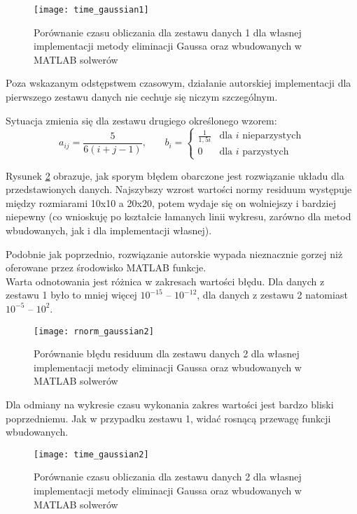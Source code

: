 \documentclass[12pt]{article}
\begin{document}
\begin{figure}[!htbp]
\centering
\texttt{[image: time\_gaussian1]}
\caption{Porównanie czasu obliczania dla zestawu danych 1 dla własnej implementacji metody eliminacji Gaussa oraz wbudowanych w MATLAB solwerów}
\label{fig:time_gaussian1}
\end{figure}
\FloatBarrier

Poza wskazanym odstępstwem czasowym, działanie autorskiej implementacji dla pierwszego zestawu danych nie cechuje się niczym szczególnym.

Sytuacja zmienia się dla zestawu drugiego określonego wzorem:
\[
a_{ij} = \frac{5}{6(i+j-1)}
\text{,}
\quad \quad
b_{i} =
\begin{cases}
\frac{1}{1,5i} & \text{dla \(i\) nieparzystych} \\
0 & \text{dla \(i\) parzystych}
\end{cases}
\]

Rysunek \ref{fig:rnorm_gaussian2} obrazuje, jak sporym błędem obarczone jest rozwiązanie układu dla przedstawionych danych. Najszybszy wzrost wartości normy residuum występuje między rozmiarami 10x10 a 20x20, potem wydaje się on wolniejszy i bardziej niepewny (co wnioskuję po kształcie łamanych linii wykresu, zarówno dla metod wbudowanych, jak i dla implementacji własnej).

Podobnie jak poprzednio, rozwiązanie autorskie wypada nieznacznie gorzej niż oferowane przez środowisko MATLAB funkcje. \\
Warta odnotowania jest różnica w zakresach wartości błędu. Dla danych z zestawu 1 było to mniej więcej \(10^{-15}\) -- \(10^{-12}\), dla danych z zestawu 2 natomiast \(10^{-5}\) -- \(10^{2}\).

\begin{figure}[!htbp]
\centering
\texttt{[image: rnorm\_gaussian2]}
\caption{Porównanie błędu residuum dla zestawu danych 2 dla własnej implementacji metody eliminacji Gaussa oraz wbudowanych w MATLAB solwerów}
\label{fig:rnorm_gaussian2}
\end{figure}
\FloatBarrier

Dla odmiany na wykresie czasu wykonania zakres wartości jest bardzo bliski poprzedniemu. Jak w przypadku zestawu 1, widać rosnącą przewagę funkcji wbudowanych.

\begin{figure}[!htbp]
\centering
\texttt{[image: time\_gaussian2]}
\caption{Porównanie czasu obliczania dla zestawu danych 2 dla własnej implementacji metody eliminacji Gaussa oraz wbudowanych w MATLAB solwerów}
\label{fig:time_gaussian2}
\end{figure}
\FloatBarrier
\end{document}
